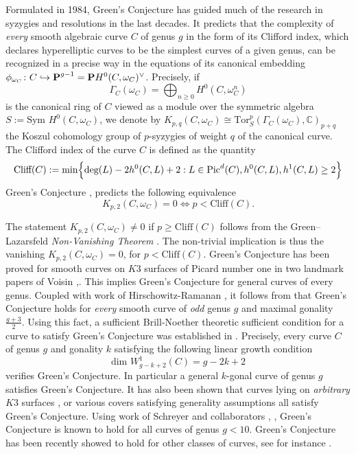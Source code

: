 \documentclass[11pt]{amsart}
\theoremstyle{definition}
\def\PP{{\textbf P}}
\begin{document}
Formulated in 1984, Green's Conjecture \cite{Gr} has guided much of the research in syzygies and resolutions in the last decades. It predicts that the complexity of \emph{every} smooth algebraic curve $C$ of genus $g$ in the form of its Clifford index, which declares hyperelliptic curves to be the simplest curves of a given genus, can be recognized in a precise way in the equations of its canonical embedding
$\phi_{\omega_C}\colon C\hookrightarrow \PP^{g-1}=\PP H^0(C,\omega_C)^{\vee}$. Precisely, if $$\Gamma_C(\omega_C)=\bigoplus_{n\geq 0} H^0(C, \omega_C^{n})$$ is the canonical ring of $C$ viewed as a module over the symmetric algebra $S:=\mbox{Sym } H^0(C, \omega_C)$, we denote by $K_{p,q}(C, \omega_C)\cong \mbox{Tor}^p_S(\Gamma_C(\omega_C), \mathbb C)_{p+q}$ the Koszul cohomology group of $p$-syzygies of weight $q$ of the canonical curve. The Clifford index of the curve $C$ is defined as the quantity
$$
\mbox{Cliff}(C):=\mbox{min}\Bigl\{\mbox{deg}(L)-2h^0(C,L)+2: L\in \mbox{Pic}^d(C), h^0(C,L), h^1(C, L)\geq 2\Bigr\}
$$
Green's Conjecture \cite{Gr}, \cite{GL} predicts the following equivalence
\begin{equation}\label{eq:Green_Conj}
K_{p,2}(C,\omega_C)=0 \Longleftrightarrow p<\mbox{Cliff}(C). 
\end{equation}

\vskip 3pt

The statement $K_{p,2}(C, \omega_C)\neq 0$ if $p\geq \mbox{Cliff}(C)$ follows from the Green--Lazarsfeld \emph{Non-Vanishing Theorem} \cite[Appendix]{Gr}. The non-trivial implication is thus the vanishing $K_{p,2}(C,\omega_C)=0$, for  $p<\mathrm{Cliff}(C)$. Green's Conjecture has been proved for smooth curves on $K3$ surfaces of Picard number one in two landmark papers of Voisin \cite{V1},\cite{V2}. This implies Green's Conjecture for general curves of every genus. Coupled with work of Hirschowitz-Ramanan \cite{HR},  it follows from \cite{V2}  that Green's Conjecture holds for \emph{every} smooth curve of \emph{odd} genus $g$ and maximal gonality $\frac{g+3}{2}$. Using this fact, a sufficient Brill-Noether theoretic sufficient condition for a curve to satisfy Green's Conjecture was established in \cite{Ap}. Precisely, every curve $C$ of genus $g$ and gonality $k$ satisfying the following linear growth condition 
\begin{equation}\label{eq:aprodu1}
\mbox{dim } W^1_{g-k+2}(C)=g-2k+2
\end{equation}
verifies Green's Conjecture. In particular a general $k$-gonal curve of genus $g$ satisfies Green's Conjecture. It has also been shown that  curves  lying  on  \emph{arbitrary} $K3$ surfaces \cite{AF1}, or various covers satisfying generality assumptions \cite{AF3} all satisfy Green's Conjecture. Using work of Schreyer and collaborators \cite{Sch}, \cite{Sag}, Green's Conjecture is known to hold for all curves of genus $g<10$. Green's Conjecture has been recently showed to hold for other classes of curves, see for instance \cite{Mo}.
\end{document}
